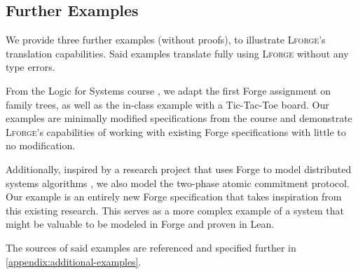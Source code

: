 \subsection{Further Examples}
We provide three further examples (without proofs), to illustrate \textsc{Lforge}'s translation capabilities. Said examples translate fully using \textsc{Lforge} without any type errors. 

From the Logic for Systems course \cite{l4s}, we adapt the first Forge assignment on family trees, as well as the in-class example with a Tic-Tac-Toe board. Our examples are minimally modified specifications from the course and demonstrate \textsc{Lforge}'s capabilities of working with existing Forge specifications with little to no modification. 

Additionally, inspired by a research project that uses Forge to model distributed systems algorithms \cite{distributedforge}, we also model the two-phase atomic commitment protocol. Our example is an entirely new Forge specification that takes inspiration from this existing research. This serves as a more complex example of a system that might be valuable to be modeled in Forge and proven in Lean. 

The sources of said examples are referenced and specified further in \cref{appendix:additional-examples}. 